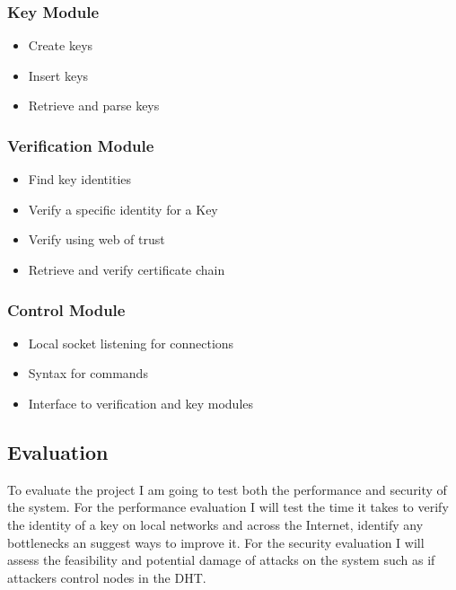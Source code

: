 \documentclass[10pt, a4paper]{article}
\begin{document}
\subsubsection{Key Module}
\begin{itemize}[noitemsep]
  \item Create keys
  \item Insert keys
  \item Retrieve and parse keys
\end{itemize}
\subsubsection{Verification Module}
\begin{itemize}[noitemsep]
  \item Find key identities
  \item Verify a specific identity for a Key
  \item Verify using web of trust
  \item Retrieve and verify certificate chain
\end{itemize}
\subsubsection{Control Module}
\begin{itemize}[noitemsep]
  \item Local socket listening for connections
  \item Syntax for commands
  \item Interface to verification and key modules
\end{itemize}
\subsection{Evaluation}
To evaluate the project I am going to test both the performance and security of the system. For the performance evaluation I will test the time it takes to verify the identity of a key on local networks and across the Internet, identify any bottlenecks an suggest ways to improve it. For the security evaluation I will assess the feasibility and potential damage of attacks on the system such as if attackers control nodes in the DHT.
\end{document}
